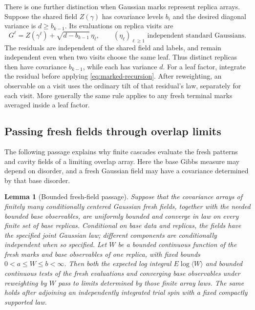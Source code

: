 \documentclass[11pt]{article}
\newtheorem{lemma}[theorem]{Lemma}
\begin{document}
There is one further distinction when Gaussian marks represent replica
arrays. Suppose the shared field $Z(\gamma)$ has covariance levels $b_i$
and the desired diagonal variance is $d\ge b_{k-1}$. Its evaluations on
replica visits are
\begin{equation}\label{eq:replica-residual}
 G^\ell=Z(\gamma^\ell)+\sqrt{d-b_{k-1}}\,\eta_\ell,
 \qquad (\eta_\ell)_{\ell\ge1}\text{ independent standard Gaussians}.
\end{equation}
The residuals are independent of the shared field and labels, and remain
independent even when two visits choose the same leaf.
Thus distinct replicas then have covariance $b_{k-1}$, while each has
variance $d$. For a leaf factor, integrate the residual before applying
\eqref{eq:marked-recursion}. After reweighting, an observable on a visit
uses the ordinary tilt of that residual's law, separately for each visit.
More generally the same rule applies to any fresh terminal marks averaged
inside a leaf factor.

\subsection{Passing fresh fields through overlap limits}

The following passage explains why finite cascades evaluate the fresh
patterns and cavity fields of a limiting overlap array. Here the base
Gibbs measure may depend on disorder, and a fresh Gaussian field may have
a covariance determined by that base disorder.

\begin{lemma}[Bounded fresh-field passage]\label{lem:fresh-field-passage}
Suppose that the covariance arrays of finitely many conditionally centered Gaussian
fresh fields, together with the needed bounded base observables, are
uniformly bounded and converge in law on every finite set of base
replicas. Conditional on base data and replicas, the fields have the
specified joint Gaussian law; different components are conditionally
independent when so specified. Let $W$ be a bounded continuous function
of the fresh marks and base observables of one replica, with fixed bounds
$0<a\le W\le b<\infty$. Then both the expected log integral
$E\log\langle W\rangle$ and bounded continuous tests of the fresh
evaluations and converging base observables under reweighting by $W$
pass to limits determined by those finite array laws. The same
holds after adjoining an independently integrated trial spin with a fixed
compactly supported law.
\end{lemma}
\end{document}
